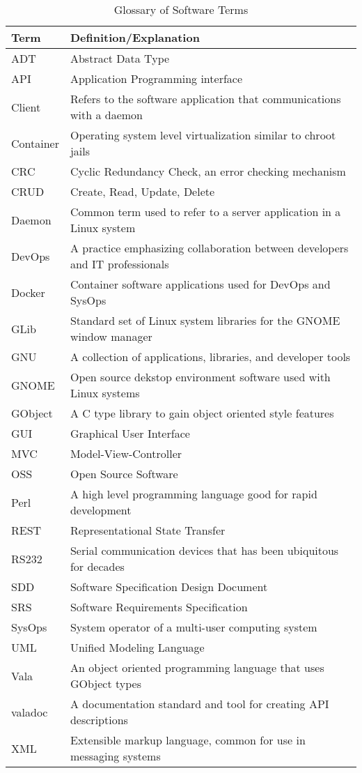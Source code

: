 \documentclass[11pt]{article}
\begin{document}
    \begin{table}[H]
      \centering
      \begin{tabular}{l p{12cm}}
        \toprule
        Term & Definition/Explanation \\ [0.5ex]
        \midrule
        ADT & Abstract Data Type \\
        API & Application Programming interface \\
        Client & Refers to the software application that communications with a daemon \\
        Container & Operating system level virtualization similar to chroot jails \\
        CRC & Cyclic Redundancy Check, an error checking mechanism \\
        CRUD & Create, Read, Update, Delete \\
        Daemon & Common term used to refer to a server application in a Linux system \\
        DevOps & A practice emphasizing collaboration between developers and IT professionals \\
        Docker & Container software applications used for DevOps and SysOps \\
        GLib & Standard set of Linux system libraries for the GNOME window manager \\
        GNU & A collection of applications, libraries, and developer tools \\
        GNOME & Open source dekstop environment software used with Linux systems \\
        GObject & A C type library to gain object oriented style features \\
        GUI & Graphical User Interface \\
        MVC & Model-View-Controller \\
        OSS & Open Source Software \\
        Perl & A high level programming language good for rapid development \\
        REST & Representational State Transfer \\
        RS232 & Serial communication devices that has been ubiquitous for decades \\
        SDD & Software Specification Design Document \\
        SRS & Software Requirements Specification \\
        SysOps & System operator of a multi-user computing system \\
        UML & Unified Modeling Language \\
        Vala & An object oriented programming language that uses GObject types \\
        valadoc & A documentation standard and tool for creating API descriptions \\
        XML & Extensible markup language, common for use in messaging systems \\
        \bottomrule
      \end{tabular}
      \caption{Glossary of Software Terms}\label{tab:gloss:sw}
    \end{table}
\end{document}
